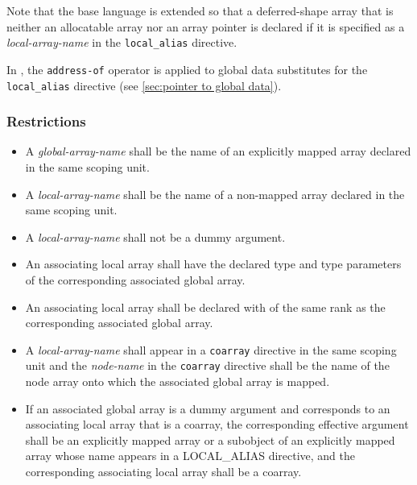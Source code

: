 Note that the base language {\Fort} is extended so that a deferred-shape
array that is neither an allocatable array nor an array pointer is
declared if it is specified as a 
{\it local-array-name} in the {\tt local\_alias} directive.

In {\XMPC}, the {\tt address-of} operator is applied to global data
substitutes for the {\tt local\_alias} directive (see \ref{sec:pointer
to global data}).


\subsubsection*{Restrictions}

\begin{itemize}
 \item A {\it global-array-name} shall be the name of an explicitly
       mapped array declared in the same scoping unit. 

 \item A {\it local-array-name} shall be the name of a non-mapped array
       declared in the same scoping unit. 

 \item A {\it local-array-name} shall not be a dummy argument.

 \item An associating local array shall have the declared type and type parameters of
       the corresponding associated global array.

 \item An associating local array shall be declared with
        of the
       same rank as the corresponding associated global array.

 \item A {\it local-array-name} shall appear in a {\tt coarray}
       directive in the same scoping unit and the {\it node-name} in the
       {\tt coarray} directive 
       shall be the name of the node array onto which the
       associated global array is mapped.

 \item 
If an associated global array is a dummy argument and corresponds to
an associating local array that is a coarray, 
the corresponding effective argument shall be
an explicitly mapped array or a subobject of 
an explicitly mapped array whose name appears
in a LOCAL\_ALIAS directive, %
and the corresponding associating local array shall be a coarray.


\end{itemize}
